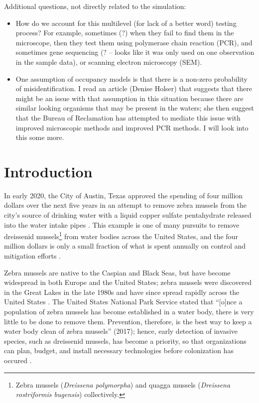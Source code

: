 \documentclass[12pt]{article}\usepackage[]{graphicx}\usepackage[]{color}
\begin{document}
Additional questions, not directly related to the simulation:
\begin{itemize}
	\item How do we account for this multilevel (for lack of a better word) testing process? For example, sometimes (?) when they fail to find them in the microscope, then they test them using polymerase chain reaction (PCR), and sometimes gene sequencing (? -- looks like it was only used on one observation in the sample data), or scanning electron microscopy (SEM).
	\item One assumption of occupancy models is that there is a non-zero probability of misidentification. I read an article (Denise Holser) that suggests that there might be an issue with that assumption in this situation because there are similar looking organisms that may be present in the waters; she then suggest that the Bureau of Reclamation has attempted to mediate this issue with improved microscopic methods and improved PCR methods. I will look into this some more.   
\end{itemize}


\section{Introduction}

In early 2020, the City of Austin, Texas approved the spending of four million dollars over the next five years in an attempt to remove zebra mussels from the city's source of drinking water with a liquid copper sulfate pentahydrate released into the water intake pipes \cite{CBS:Austin}. This example is one of many pursuits to remove dreissenid mussels\footnote{Zebra mussels (\textit{Dreissena polymorpha}) and quagga mussels (\textit{Dreissena rostriformis bugensis}) collectively.} from water bodies across the United States, and the four million dollars is only a small fraction of what is spent annually on control and mitigation efforts \cite{Sepulveda:eDNA}. 

Zebra mussels are native to the Caspian and Black Seas, but have become widespread in both Europe and the United States; zebra mussels were discovered in the Great Lakes in the late 1980s and have since spread rapidly across the United States \cite{NPS}. The United States National Park Service stated that ``[o]nce a population of zebra mussels has become established in a water body, there is very little to be done to remove them. Prevention, therefore, is the best way to keep a water body clean of zebra mussels'' (2017); hence, early detection of invasive species, such as dreissenid mussels, has become a priority, so that organizations can plan, budget, and install necessary technologies before colonization has occured \cite{Holser:body}. 
\end{document}
